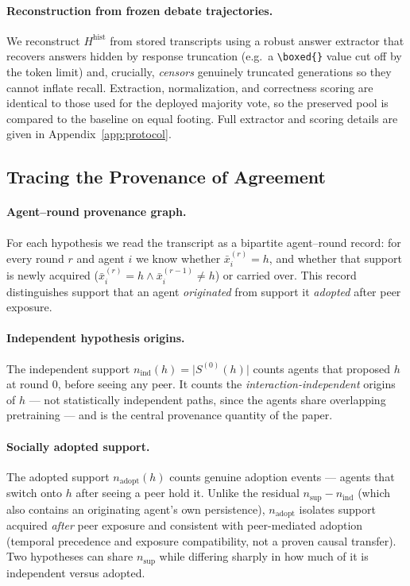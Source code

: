 \paragraph{Reconstruction from frozen debate trajectories.}
\label{par:posthoc_reconstruction}
We reconstruct $H^{\mathrm{hist}}$ from stored transcripts using a robust answer extractor that recovers
answers hidden by response truncation (e.g.\ a \texttt{\textbackslash boxed\{\}} value cut off by the
token limit) and, crucially, \emph{censors} genuinely truncated generations so they cannot inflate recall.
Extraction, normalization, and correctness scoring are identical to those used for the deployed majority
vote, so the preserved pool is compared to the baseline on equal footing. Full extractor and scoring
details are given in Appendix~\ref{app:protocol}.

\subsection{Tracing the Provenance of Agreement}
\label{subsec:provenance_tracking}

\paragraph{Agent--round provenance graph.}
\label{par:provenance_graph}
For each hypothesis we read the transcript as a bipartite agent--round record: for every round $r$ and
agent $i$ we know whether $\bar{x}_i^{(r)}=h$, and whether that support is newly acquired
($\bar{x}_i^{(r)}=h\wedge \bar{x}_i^{(r-1)}\ne h$) or carried over. This record distinguishes
support that an agent \emph{originated} from support it \emph{adopted} after peer exposure.

\paragraph{Independent hypothesis origins.}
\label{par:independent_origins}
The independent support $n_{\mathrm{ind}}(h)=\lvert S^{(0)}(h)\rvert$ counts agents that proposed $h$ at
round $0$, before seeing any peer. It counts the \emph{interaction-independent} origins of $h$ --- not
statistically independent paths, since the agents share overlapping pretraining --- and is the central
provenance quantity of the paper.

\paragraph{Socially adopted support.}
\label{par:inherited_support}
The adopted support $n_{\mathrm{adopt}}(h)$ counts genuine adoption events --- agents that switch onto $h$
after seeing a peer hold it. Unlike the residual $n_{\mathrm{sup}}-n_{\mathrm{ind}}$ (which also contains an
originating agent's own persistence), $n_{\mathrm{adopt}}$ isolates support acquired \emph{after} peer
exposure and consistent with peer-mediated adoption (temporal precedence and exposure compatibility, not a
proven causal transfer). Two hypotheses can share $n_{\mathrm{sup}}$ while differing sharply in how much of
it is independent versus adopted.

